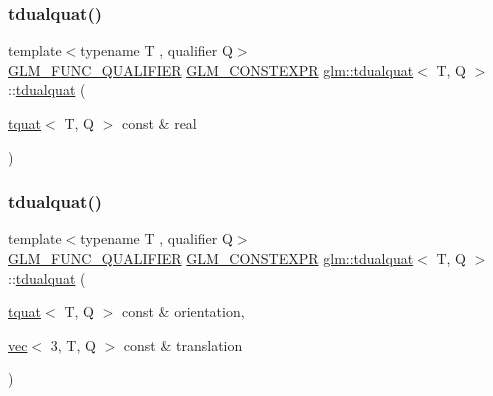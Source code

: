 \mbox{\label{structglm_1_1tdualquat_aca6bbe930bd0b26c217b535fe06df688}} 
\subsubsection{\texorpdfstring{tdualquat()}{tdualquat()}\hspace{0.1cm}{\footnotesize\ttfamily [4/11]}}
{\footnotesize\ttfamily template$<$typename T , qualifier Q$>$ \\
\mbox{\hyperlink{setup_8hpp_a33fdea6f91c5f834105f7415e2a64407}{G\+L\+M\+\_\+\+F\+U\+N\+C\+\_\+\+Q\+U\+A\+L\+I\+F\+I\+ER}} \mbox{\hyperlink{setup_8hpp_a08b807947b47031d3a511f03f89645ad}{G\+L\+M\+\_\+\+C\+O\+N\+S\+T\+E\+X\+PR}} \mbox{\hyperlink{structglm_1_1tdualquat}{glm\+::tdualquat}}$<$ T, Q $>$\+::\mbox{\hyperlink{structglm_1_1tdualquat}{tdualquat}} (\begin{DoxyParamCaption}\item[{\mbox{\hyperlink{structglm_1_1tquat}{tquat}}$<$ T, Q $>$ const \&}]{real }\end{DoxyParamCaption})}

\mbox{\label{structglm_1_1tdualquat_aedfbe6fe7039943ccbf7d178731fa9b7}} 
\subsubsection{\texorpdfstring{tdualquat()}{tdualquat()}\hspace{0.1cm}{\footnotesize\ttfamily [5/11]}}
{\footnotesize\ttfamily template$<$typename T , qualifier Q$>$ \\
\mbox{\hyperlink{setup_8hpp_a33fdea6f91c5f834105f7415e2a64407}{G\+L\+M\+\_\+\+F\+U\+N\+C\+\_\+\+Q\+U\+A\+L\+I\+F\+I\+ER}} \mbox{\hyperlink{setup_8hpp_a08b807947b47031d3a511f03f89645ad}{G\+L\+M\+\_\+\+C\+O\+N\+S\+T\+E\+X\+PR}} \mbox{\hyperlink{structglm_1_1tdualquat}{glm\+::tdualquat}}$<$ T, Q $>$\+::\mbox{\hyperlink{structglm_1_1tdualquat}{tdualquat}} (\begin{DoxyParamCaption}\item[{\mbox{\hyperlink{structglm_1_1tquat}{tquat}}$<$ T, Q $>$ const \&}]{orientation,  }\item[{\mbox{\hyperlink{structglm_1_1vec}{vec}}$<$ 3, T, Q $>$ const \&}]{translation }\end{DoxyParamCaption})}


